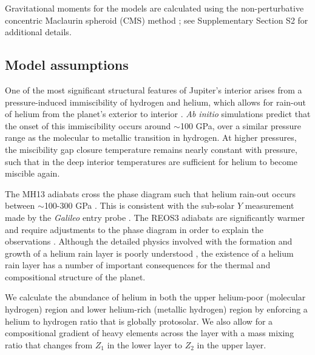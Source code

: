 Gravitational moments for the models are calculated using the non-perturbative
concentric Maclaurin spheroid (CMS) method
\citep{hubbard2012,hubbard2013,hubbard2016,wahl2016}; see Supplementary Section
S2 for additional details. 

\subsection{Model assumptions}\label{sec:model}

One of the most significant structural features of Jupiter's interior
arises from a pressure-induced immiscibility of hydrogen and helium, which allows for
rain-out of helium from the planet's exterior to interior
\citep{stevenson1977a,stevenson1977b}. \textit{Ab initio} simulations
\citep{Morales2009,Lorenzen2009,Wilson2010,morales2013} predict that the onset of this
immiscibility occurs around $\sim$100 GPa, over a similar pressure range as the
molecular to metallic transition in hydrogen. At higher pressures, the miscibility
gap closure temperature remains nearly constant with pressure, such that in the deep
interior temperatures are sufficient for helium to become miscible again.

The MH13 adiabats cross the \citet{morales2013} phase diagram such 
that helium rain-out occurs between $\sim$100-300 GPa \citep{militzer2016}.
This is consistent with the sub-solar $Y$ measurement made by the
\textit{Galileo} entry probe \citep{Zahn1998}. The REOS3 adiabats are
significantly warmer and require adjustments to the phase diagram in order to
explain the observations \citep{nettelmann2015}.  Although the detailed physics
involved with the formation and growth of a helium rain layer is poorly
understood \citep{Fortney2010}, the existence of a helium rain layer has a
number of important consequences for the thermal and compositional structure of
the planet.

We calculate the abundance of helium in both the upper helium-poor
(molecular hydrogen) region and lower helium-rich (metallic hydrogen) region by
enforcing a helium to hydrogen ratio that is globally protosolar. We also allow
for a compositional gradient of heavy elements across the layer with a mass
mixing ratio that changes from $Z_1$ in the lower layer to $Z_2$ in the upper
layer. 


